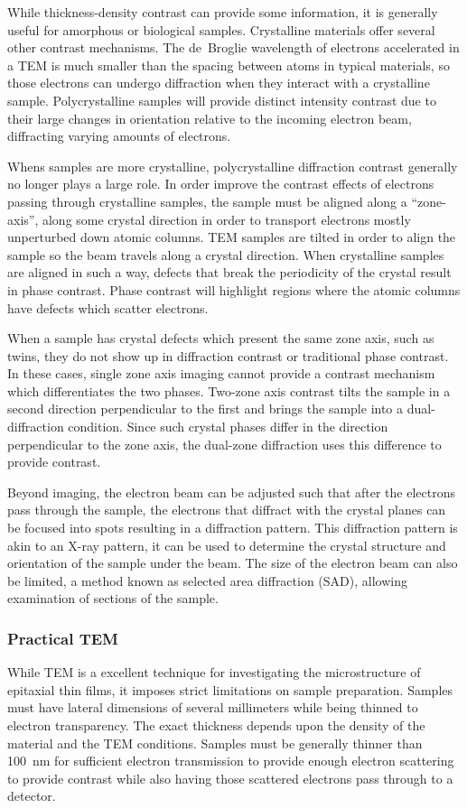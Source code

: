 While thickness-density contrast can provide some information, it is generally useful for amorphous or biological samples.
Crystalline materials offer several other contrast mechanisms.
The de~Broglie wavelength of electrons accelerated in a TEM is much smaller than the spacing between atoms in typical materials, so those electrons can undergo diffraction when they interact with a crystalline sample.
Polycrystalline samples will provide distinct intensity contrast due to their large changes in orientation relative to the incoming electron beam, diffracting varying amounts of electrons\cite{Egerton2005}.

Whens samples are more crystalline, polycrystalline diffraction contrast generally no longer plays a large role.
In order improve the contrast effects of electrons passing through crystalline samples, the sample must be aligned along a ``zone-axis'', along some crystal direction in order to transport electrons mostly unperturbed down atomic columns.
TEM samples are tilted in order to align the sample so the beam travels along a crystal direction.
When crystalline samples are aligned in such a way, defects that break the periodicity of the crystal result in phase contrast.
Phase contrast will highlight regions where the atomic columns have defects which scatter electrons\cite{Egerton2005}.

When a sample has crystal defects which present the same zone axis, such as twins, they do not show up in diffraction contrast or traditional phase contrast.
In these cases, single zone axis imaging cannot provide a contrast mechanism which differentiates the two phases.
Two-zone axis contrast tilts the sample in a second direction perpendicular to the first and brings the sample into a dual-diffraction condition.
Since such crystal phases differ in the direction perpendicular to the zone axis, the dual-zone diffraction uses this difference to provide contrast.

Beyond imaging, the electron beam can be adjusted such that after the electrons pass through the sample, the electrons that diffract with the crystal planes can be focused into spots resulting in a diffraction pattern.
This diffraction pattern is akin to an X-ray pattern, it can be used to determine the crystal structure and orientation of the sample under the beam.
The size of the electron beam can also be limited, a method known as selected area diffraction (SAD), allowing examination of sections of the sample.
\subsubsection{Practical TEM} While TEM is a excellent technique for investigating the microstructure of epitaxial thin films, it imposes strict limitations on sample preparation.
Samples must have lateral dimensions of several millimeters while being thinned to electron transparency.
The exact thickness depends upon the density of the material and the TEM conditions.
Samples must be generally thinner than 100~nm for sufficient electron transmission to provide enough electron scattering to provide contrast while also having those scattered electrons pass through to a detector.

